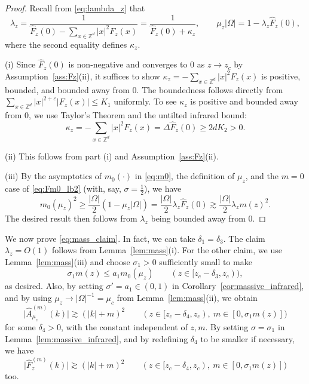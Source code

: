 \documentclass[11pt,hidelinks]{article}
\theoremstyle{plain}
\numberwithin{equation}{section}
\newcommand{\eps}{\varepsilon}
\newcommand{\Z}{\mathbb{Z}}
\newcommand{\inv}{^{-1}}
\renewcommand{\(}{\left(}
\renewcommand{\)}{\right)}
\newcommand{\half}{\frac{1}{2}}
\newcommand{\1}{\mathds{1}}
\providecommand{\abs}[1]{\lvert#1\rvert}
\newcommand{\muz}{{\mu_z}}
\newcommand{\supm}{^{(m)}}
\begin{document}
\begin{proof}
Recall from \eqref{eq:lambda_z} that
\begin{equation}
\lambda_z = \frac{1} { \hat F_z(0) - \sum_{x\in \Z^d} \abs x^2 F_z(x) }
	= \frac 1 { \hat F_z(0) + \kappa_z},
\qquad \mu_z\abs\Omega = 1 - \lambda_z \hat F_z(0), 
\end{equation}
where the second equality defines $\kappa_z$.

\smallskip\noindent
(i) Since $\hat F_z (0)$ is non-negative and converges to 0 as $z\to z_c$ by Assumption~\ref{ass:Fz}(ii), it suffices to show $\kappa_z = - \sum_{x\in \Z^d} \abs x^2 F_z(x)$ is positive, bounded, and bounded away from $0$. 
The boundedness follows directly from $\sum_{x\in \Z^d} \abs x^{2+\eps} \abs{ F_z(x) } \le K_1$ uniformly.
To see $\kappa_z$ is positive and bounded away from 0, we use Taylor's Theorem and the untilted infrared bound:
\begin{equation}
 \kappa_z =  - \sum_{x\in \Z^d} \abs x^2 F_z(x)
	= \Delta \hat F_z(0) \ge 2d K_2 > 0.
\end{equation}

\noindent
(ii) This follows from part (i) and Assumption~\ref{ass:Fz}(ii).

\smallskip\noindent
(iii)
By the asymptotics of $m_0(\cdot)$ in \eqref{eq:m0}, the definition of $\mu_z$, and the $m=0$ case of \eqref{eq:Fm0_lb2} (with, say, $\sigma=\half$), we have
\begin{equation}
m_0(\mu_z)^2
\ge \frac {\abs\Omega} 2 (1 - \mu_z \abs\Omega)
= \frac{ \abs\Omega } 2 \lambda_z \hat F_z(0)
\gtrsim \frac{ \abs\Omega } 2 \lambda_z m(z)^2. 
\end{equation}
The desired result then follows from $\lambda_z$ being bounded away from 0.
\end{proof}

We now prove \eqref{eq:mass_claim}.
In fact, we can take $\delta_1 = \delta_3$.
The claim $\lambda_z = O(1)$ follows from Lemma~\ref{lem:mass}(i). 
For the other claim, we use Lemma~\ref{lem:mass}(iii) and choose $\sigma_1 > 0$ sufficiently small to make
\begin{equation}
\sigma_1 m(z) \le a_1 m_0(\muz)
\qquad (z \in [z_c - \delta_3, z_c)),
\end{equation}
as desired.
Also, 
by setting $\sigma' = a_1 \in (0,1)$ in Corollary~\ref{cor:massive_infrared},
and by using $\mu_z \to \abs\Omega\inv = \mu_c$ from Lemma~\ref{lem:mass}(ii), we obtain
\begin{equation} \label{eq:A_massive}
\abs{ \hat A_\muz\supm (k) } \gtrsim (\abs k + m)^2
	\qquad ( z \in [z_c - \delta_4, z_c),\  m \in [0, \sigma_1 m(z)] )
\end{equation}
for some $\delta_4 > 0$,
with the constant independent of $z,m$. 
By setting $\sigma = \sigma_1$ in Lemma~\ref{lem:massive_infrared}, and by redefining $\delta_4$ to be smaller if necessary, we have
\begin{equation} \label{eq:F_massive}
\abs{ \hat F_z \supm (k) } 
\gtrsim (\abs k  + m)^2
	\qquad ( z \in [z_c - \delta_4, z_c),\  m \in [0, \sigma_1 m(z)] )
\end{equation}
too.
\end{document}
